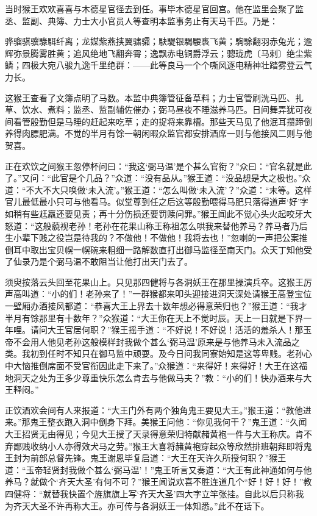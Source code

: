 \documentclass[12pt,UTF8]{ctexbook}
\begin{document}
当时猴王欢欢喜喜与木德星官径去到任。事毕木德星官回宫。他在监里会聚了监丞、监副、典簿、力士大小官员人等查明本监事务止有天马千匹。乃是：

骅骝骐骥騄駬纤离；龙媒紫燕挟翼骕骦；駃騠银騔騕褭飞黄；騊駼翻羽赤兔光；逾辉弥景腾雾胜黄；追风绝地飞翻奔霄；逸飘赤电铜爵浮云；骢珑虎〔马剌〕绝尘紫鳞；四极大宛八骏九逸千里绝群：——此等良马一个个嘶风逐电精神壮踏雾登云气力长。

这猴王查看了文簿点明了马数。本监中典簿管征备草料；力士官管刷洗马匹、扎草、饮水、煮料；监丞、监副辅佐催办；弼马昼夜不睡滋养马匹。日间舞弄犹可夜间看管殷勤但是马睡的赶起来吃草；走的捉将来靠槽。那些天马见了他泯耳攒蹄倒养得肉膘肥满。不觉的半月有馀一朝闲暇众监官都安排酒席一则与他接风二则与他贺喜。

正在欢饮之间猴王忽停杯问曰：“我这‘弼马温’是个甚么官衔？”众曰：“官名就是此了。”又问：“此官是个几品？”众道：“没有品从。”猴王道：“没品想是大之极也。”众道：“不大不大只唤做‘未入流’。”猴王道：“怎么叫做‘未入流’？”众道：“末等。这样官儿最低最小只可与他看马。似堂尊到任之后这等殷勤喂得马肥只落得道声‘好’字如稍有些尪羸还要见责；再十分伤损还要罚赎问罪。”猴王闻此不觉心头火起咬牙大怒道：“这般藐视老孙！老孙在花果山称王称祖怎么哄我来替他养马？养马者乃后生小辈下贱之役岂是待我的？不做他！不做他！我将去也！”忽喇的一声把公案推倒耳中取出宝贝幌一幌碗来粗细一路解数直打出御马监径至南天门。众天丁知他受了仙录乃是个弼马温不敢阻当让他打出天门去了。

须臾按落云头回至花果山上。只见那四健将与各洞妖王在那里操演兵卒。这猴王厉声高叫道：“小的们！老孙来了！”一群猴都来叩头迎接进洞天深处请猴王高登宝位一壁厢办酒接风都道：“恭喜大王上界去十数年想必得意荣归也？”猴王道：“我才半月有馀那里有十数年？”众猴道：“大王你在天上不觉时辰。天上一日就是下界一年哩。请问大王官居何职？”猴王摇手道：“不好说！不好说！活活的羞杀人！那玉帝不会用人他见老孙这般模样封我做个甚么‘弼马温’原来是与他养马未入流品之类。我初到任时不知只在御马监中顽耍。及今日问我同寮始知是这等卑贱。老孙心中大恼推倒席面不受官衔因此走下来了。”众猴道：“来得好！来得好！大王在这福地洞天之处为王多少尊重快乐怎么肯去与他做马夫？”教：“小的们！快办酒来与大王释闷。”

正饮酒欢会间有人来报道：“大王门外有两个独角鬼王要见大王。”猴王道：“教他进来。”那鬼王整衣跑入洞中倒身下拜。美猴王问他：“你见我何干？”鬼王道：“久闻大王招贤无由得见；今见大王授了天录得意荣归特献赭黄袍一件与大王称庆。肯不弃鄙贱收纳小人亦得效犬马之劳。”猴王大喜将赭黄袍穿起众等欣然排班朝拜即将鬼王封为前部总督先锋。鬼王谢恩毕复启道：“大王在天许久所授何职？”猴王道：“玉帝轻贤封我做个甚么‘弼马温’！”鬼王听言又奏道：“大王有此神通如何与他养马？就做个‘齐天大圣’有何不可？”猴王闻说欢喜不胜连道几个“好！好！好！”教四健将：“就替我快置个旌旗旗上写‘齐天大圣’四大字立竿张挂。自此以后只称我为齐天大圣不许再称大王。亦可传与各洞妖王一体知悉。”此不在话下。
\end{document}
